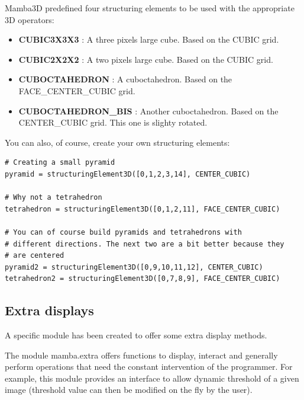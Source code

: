 \documentclass[a4paper,10pt,oneside]{article}
\begin{document}


Mamba3D predefined four structuring elements to be used with the appropriate
3D operators:

\begin{itemize}
\item \textbf{CUBIC3X3X3} : A three pixels large cube. Based on the CUBIC grid.
\item \textbf{CUBIC2X2X2} : A two pixels large cube. Based on the CUBIC grid.
\item \textbf{CUBOCTAHEDRON} : A cuboctahedron. Based on the
FACE\_CENTER\_CUBIC grid.
\item \textbf{CUBOCTAHEDRON\_BIS} : Another cuboctahedron. Based on the
CENTER\_CUBIC grid. This one is slighty rotated.
\end{itemize}

You can also, of course, create your own structuring elements:

\lstset{language=Python}
\begin{lstlisting}
# Creating a small pyramid
pyramid = structuringElement3D([0,1,2,3,14], CENTER_CUBIC)

# Why not a tetrahedron
tetrahedron = structuringElement3D([0,1,2,11], FACE_CENTER_CUBIC)

# You can of course build pyramids and tetrahedrons with
# different directions. The next two are a bit better because they
# are centered
pyramid2 = structuringElement3D([0,9,10,11,12], CENTER_CUBIC)
tetrahedron2 = structuringElement3D([0,7,8,9], FACE_CENTER_CUBIC)
\end{lstlisting}

\subsection{Extra displays}
\label{cha:extra}

A specific module has been created to offer some extra display methods.

The module mamba.extra offers functions to display, interact and generally 
perform operations that need the constant intervention of the programmer. For
example, this module provides an interface to allow dynamic threshold of a given
image (threshold value can then be modified on the fly by the user).
\end{document}
